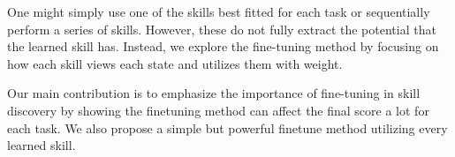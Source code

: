 One might simply use one of the skills best fitted for each task or sequentially perform a series of skills.
However, these do not fully extract the potential that the learned skill has. 
Instead, we explore the fine-tuning method by focusing on how each skill views each state
and utilizes them with weight.

Our main contribution is to emphasize the importance of fine-tuning in skill discovery by showing the finetuning method can affect the final score a lot for each task. We also propose a simple but powerful finetune method utilizing every learned skill.

